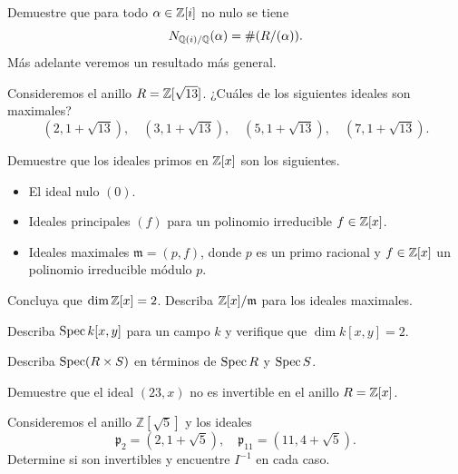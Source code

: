 \begin{ejercicio}
  Demuestre que para todo $\alpha \in \mathbb{Z} [i]$ no nulo se tiene
  $$N_{\mathbb{Q} (i)/\mathbb{Q}} (\alpha) = \# (R/(\alpha)).$$
  Más adelante veremos un resultado más general.
\end{ejercicio}

\begin{ejercicio}
  Consideremos el anillo $R = \mathbb{Z} [\sqrt{13}]$. ¿Cuáles de los siguientes
  ideales son maximales?
  \[ (2, 1 + \sqrt{13}), \quad
     (3, 1 + \sqrt{13}), \quad
     (5, 1 + \sqrt{13}), \quad
     (7, 1 + \sqrt{13}). \]
\end{ejercicio}

\begin{ejercicio}
  Demuestre que los ideales primos en $\mathbb{Z} [x]$ son los siguientes.

  \begin{itemize}
  \item El ideal nulo $(0)$.

  \item Ideales principales $(f)$ para un polinomio irreducible $f \in \mathbb{Z} [x]$.

  \item Ideales maximales $\mathfrak{m} = (p,f)$, donde $p$ es un primo racional
    y $f \in \mathbb{Z} [x]$ un polinomio irreducible módulo $p$.
  \end{itemize}

  Concluya que $\dim \mathbb{Z} [x] = 2$. Describa $\mathbb{Z} [x]/\mathfrak{m}$ para los
  ideales maximales.
\end{ejercicio}

\begin{ejercicio}
  Describa $\operatorname{Spec} k [x,y]$ para un campo $k$ y verifique que $\dim k [x,y] = 2$.
\end{ejercicio}

\begin{ejercicio}
  Describa $\operatorname{Spec} (R\times S)$ en términos de $\operatorname{Spec} R$ y $\operatorname{Spec} S$.
\end{ejercicio}

\begin{ejercicio}
  Demuestre que el ideal $(23,x)$ no es invertible en el anillo $R = \mathbb{Z} [x]$.
\end{ejercicio}

\begin{ejercicio}
  Consideremos el anillo $\mathbb{Z} [\sqrt{5}]$ y los ideales
  \[ \mathfrak{p}_2 = (2, 1 + \sqrt{5}), \quad
     \mathfrak{p}_{11} = (11, 4 + \sqrt{5}). \]
  Determine si son invertibles y encuentre $I^{-1}$ en cada caso.
\end{ejercicio}

